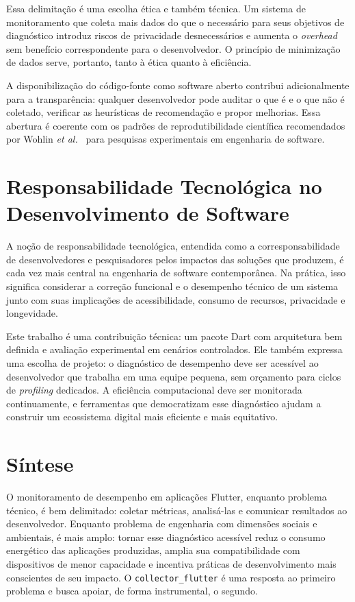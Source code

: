 Essa delimitação é uma escolha ética e também técnica. Um sistema de monitoramento que coleta mais dados do que o necessário para seus objetivos de diagnóstico introduz riscos de privacidade desnecessários e aumenta o \textit{overhead} sem benefício correspondente para o desenvolvedor. O princípio de minimização de dados serve, portanto, tanto à ética quanto à eficiência.

A disponibilização do código-fonte como software aberto contribui adicionalmente para a transparência: qualquer desenvolvedor pode auditar o que é e o que não é coletado, verificar as heurísticas de recomendação e propor melhorias. Essa abertura é coerente com os padrões de reprodutibilidade científica recomendados por Wohlin \textit{et al.}~\cite{wohlin2012} para pesquisas experimentais em engenharia de software.

\section{Responsabilidade Tecnológica no Desenvolvimento de Software}

A noção de responsabilidade tecnológica, entendida como a corresponsabilidade de desenvolvedores e pesquisadores pelos impactos das soluções que produzem, é cada vez mais central na engenharia de software contemporânea. Na prática, isso significa considerar a correção funcional e o desempenho técnico de um sistema junto com suas implicações de acessibilidade, consumo de recursos, privacidade e longevidade.

Este trabalho é uma contribuição técnica: um pacote Dart com arquitetura bem definida e avaliação experimental em cenários controlados. Ele também expressa uma escolha de projeto: o diagnóstico de desempenho deve ser acessível ao desenvolvedor que trabalha em uma equipe pequena, sem orçamento para ciclos de \textit{profiling} dedicados. A eficiência computacional deve ser monitorada continuamente, e ferramentas que democratizam esse diagnóstico ajudam a construir um ecossistema digital mais eficiente e mais equitativo.

\section{Síntese}

O monitoramento de desempenho em aplicações Flutter, enquanto problema técnico, é bem delimitado: coletar métricas, analisá-las e comunicar resultados ao desenvolvedor. Enquanto problema de engenharia com dimensões sociais e ambientais, é mais amplo: tornar esse diagnóstico acessível reduz o consumo energético das aplicações produzidas, amplia sua compatibilidade com dispositivos de menor capacidade e incentiva práticas de desenvolvimento mais conscientes de seu impacto. O \texttt{collector\_flutter} é uma resposta ao primeiro problema e busca apoiar, de forma instrumental, o segundo.

